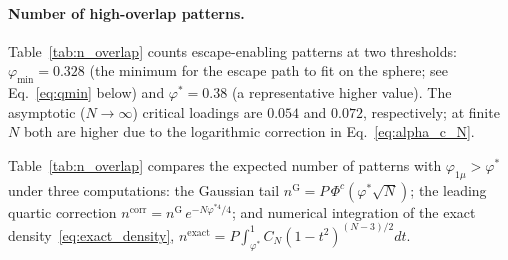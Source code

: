 \documentclass[11pt]{article}
\begin{document}
\paragraph{Number of high-overlap patterns.}
Table~\ref{tab:n_overlap} counts escape-enabling patterns at two thresholds: $\varphi_{\min} = 0.328$ (the minimum for the escape path to fit on the sphere; see Eq.~\eqref{eq:qmin} below) and $\varphi^* = 0.38$ (a representative higher value).  The asymptotic ($N\!\to\!\infty$) critical loadings are $0.054$ and $0.072$, respectively; at finite~$N$ both are higher due to the logarithmic correction in Eq.~\eqref{eq:alpha_c_N}.

Table~\ref{tab:n_overlap} compares the expected number of patterns with $\varphi_{1\mu} > \varphi^*$ under three computations: the Gaussian tail $n^{\mathrm{G}} = P\,\Phi^c(\varphi^*\!\sqrt{N})$; the leading quartic correction $n^{\mathrm{corr}} = n^{\mathrm{G}}\,e^{-N\varphi^{*4}/4}$; and numerical integration of the exact density~\eqref{eq:exact_density}, $n^{\mathrm{exact}} = P\!\int_{\varphi^*}^{1}\!C_N(1-t^2)^{(N-3)/2}dt$.
\end{document}
